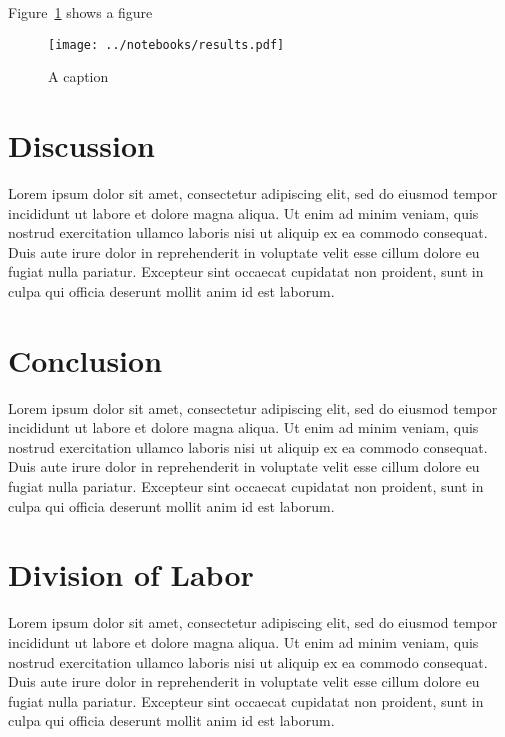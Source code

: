\documentclass[11pt,a4paper]{article}
\begin{document}
Figure~\ref{fig:a_label} shows a figure

\begin{figure}[ht]
	\centering
	\texttt{[image: ../notebooks/results.pdf]}
	\caption{A caption}
	\label{fig:a_label}
\end{figure}

\section{Discussion}

Lorem ipsum dolor sit amet, consectetur adipiscing elit, sed do eiusmod tempor incididunt ut labore et dolore magna aliqua. Ut enim ad minim veniam, quis nostrud exercitation ullamco laboris nisi ut aliquip ex ea commodo consequat. Duis aute irure dolor in reprehenderit in voluptate velit esse cillum dolore eu fugiat nulla pariatur. Excepteur sint occaecat cupidatat non proident, sunt in culpa qui officia deserunt mollit anim id est laborum.


\section{Conclusion}
Lorem ipsum dolor sit amet, consectetur adipiscing elit, sed do eiusmod tempor incididunt ut labore et dolore magna aliqua. Ut enim ad minim veniam, quis nostrud exercitation ullamco laboris nisi ut aliquip ex ea commodo consequat. Duis aute irure dolor in reprehenderit in voluptate velit esse cillum dolore eu fugiat nulla pariatur. Excepteur sint occaecat cupidatat non proident, sunt in culpa qui officia deserunt mollit anim id est laborum.


\section{Division of Labor}
Lorem ipsum dolor sit amet, consectetur adipiscing elit, sed do eiusmod tempor incididunt ut labore et dolore magna aliqua. Ut enim ad minim veniam, quis nostrud exercitation ullamco laboris nisi ut aliquip ex ea commodo consequat. Duis aute irure dolor in reprehenderit in voluptate velit esse cillum dolore eu fugiat nulla pariatur. Excepteur sint occaecat cupidatat non proident, sunt in culpa qui officia deserunt mollit anim id est laborum.
\end{document}
